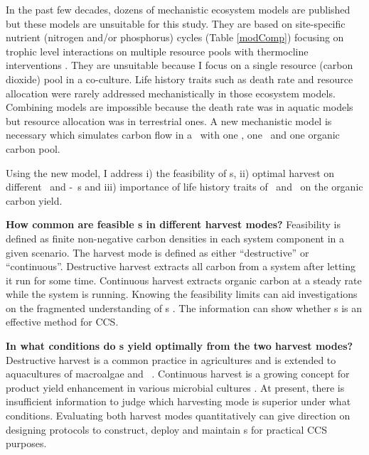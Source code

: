 \documentclass[../thesis.tex]{subfiles} %
\begin{document}
In the past few decades, dozens of mechanistic ecosystem models are published but these models are unsuitable for this study.  They are based on site-specific nutrient (nitrogen and/or phosphorus) cycles (Table \ref{modComp}) focusing on trophic level interactions on multiple resource pools \autocite{llebot2010role,mitra2009closure,findlay2006modelling} with thermocline interventions \autocite{anderson2015empower,kidston2013phytoplankton,llebot2010role}.  They are unsuitable because I focus on a single resource (carbon dioxide) pool in a co-culture.  Life history traits such as death rate \autocite{anderson2015empower,kidston2013phytoplankton} and resource allocation \autocite{xiao1996relative} were rarely addressed mechanistically in those ecosystem models.  Combining models are impossible because the death rate was in aquatic models but resource allocation was in terrestrial ones.  A new mechanistic model is necessary which simulates carbon flow in a \pbs\ with one \phy, one \bacm\ and one organic carbon pool.

Using the new model, I address \Rn{1}) the feasibility of \pbs s, \Rn{2}) optimal harvest on different \phy\ and \phy-\bac\ \pbs s and \Rn{3}) importance of life history traits of \phy\ and \bac\ on the organic carbon yield.

\textbf{How common are feasible \pbs s in different harvest modes?}  Feasibility is defined as finite non-negative carbon densities in each system component in a given scenario.  The harvest mode is defined as either ``destructive” or ``continuous”.  Destructive harvest extracts all carbon from a system after letting it run for some time.  Continuous harvest extracts organic carbon at a steady rate while the system is running.  Knowing the feasibility limits can aid investigations on the fragmented understanding of \pbs s \autocite{fuentes2016impact}.  The information can show whether \pbs s is an effective method for CCS.

\textbf{In what conditions do \pbs s yield optimally from the two harvest modes?}  Destructive harvest is a common practice in agricultures and is extended to aquacultures of macroalgae \autocite{duarte2017can} and \phy\  \autocite{evanson_2019}.  Continuous harvest is a growing concept for product yield enhancement in various microbial cultures \autocite{aytekin2016statistical,fuentes2016impact}.  At present, there is insufficient information to judge which harvesting mode is superior under what conditions.  Evaluating both harvest modes quantitatively can give direction on designing protocols to construct, deploy and maintain \pbs s for practical CCS purposes.
\end{document}
